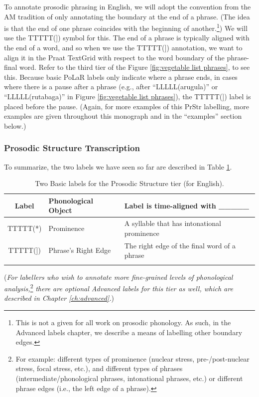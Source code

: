 \documentclass[11pt, twoside]{memoir}
\begin{document}
To annotate prosodic phrasing in English, we will adopt the convention from the AM tradition of only annotating the boundary at the end of a phrase. (The idea is that the end of one phrase coincides with the beginning of another.\footnote{This is not a given for all work on prosodic phonology. As such, in the Advanced labels chapter, we describe a means of labelling other boundary edges.}) We will use the TTTTT(]) symbol for this. The end of a phrase is typically aligned with the end of a word, and so when we use the TTTTT(]) annotation, we want to align it in the Praat TextGrid with respect to the word boundary of the phrase-final word. Refer to the third tier of the Figure \ref{fig:vegetable list phrases}, to see this. Because basic PoLaR labels only indicate where a phrase ends, in cases where there is a pause after a phrase (e.g., after “LLLLL(arugula)” or “LLLLL(rutabaga)” in Figure \ref{fig:vegetable list phrases}), the TTTTT(]) label is placed before the pause. (Again, for more examples of this PrStr labelling, more examples are given throughout this monograph and in the “examples” section below.)

\subsubsection{Prosodic Structure Transcription}
To summarize, the two labels we have seen so far are described in Table \ref{2 PrStr basic labels}.

\begin{longtable}{cll} \toprule \textbf{Label} & \textbf{Phonological Object} & \textbf{Label is time-aligned with \_\_\_\_\_}\tabularnewline
\midrule \endhead
TTTTT(*) & Prominence & A syllable that has intonational prominence \tabularnewline
TTTTT(]) & Phrase’s Right Edge & The right edge of the final word of a phrase \tabularnewline
\bottomrule 
\caption{Two Basic labels for the Prosodic Structure tier (for English).%
\label{2 PrStr basic labels}%
}
\end{longtable}

(\textit{For labellers who wish to annotate more fine-grained levels of phonological analysis,}\footnote{For example: different types of prominence (nuclear stress, pre-\slash post-nuclear stress, focal stress, etc.), and different types of phrases (intermediate\slash phonological phrases, intonational phrases, etc.) or different phrase edges (i.e., the left edge of a phrase).} \textit{there are optional Advanced labels for this tier as well, which are described in Chapter \ref{ch:advanced}.})
\end{document}
